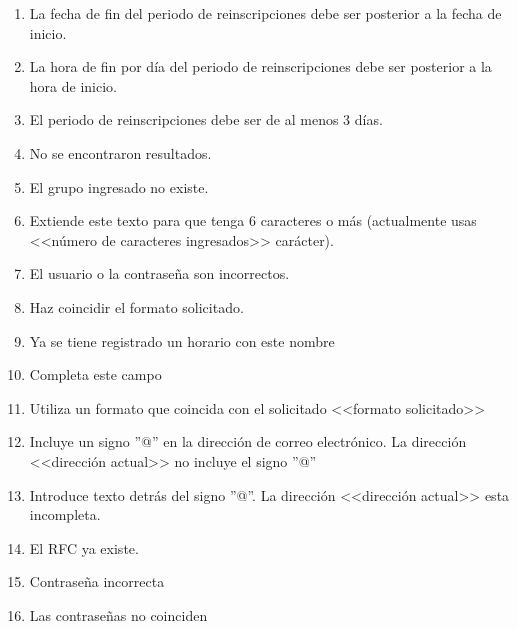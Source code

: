 \begin{enumerate}[{ME} 1.]
\item La fecha de fin del periodo de reinscripciones debe ser posterior a la fecha de inicio.
\item La hora de fin por día del periodo de reinscripciones debe ser posterior a la hora de inicio.
\item El periodo de reinscripciones debe ser de al menos 3 días.
\item No se encontraron resultados.
\item El grupo ingresado no existe.
\item Extiende este texto para que tenga 6 caracteres o más (actualmente usas <<número de caracteres ingresados>> carácter).
\item El usuario o la contraseña son incorrectos.
\item Haz coincidir el formato solicitado.
\item Ya se tiene registrado un horario con este nombre
\item Completa este campo
\item Utiliza un formato que coincida con el solicitado <<formato solicitado>>
\item Incluye un signo ''@''  en la dirección de correo electrónico. La dirección <<dirección actual>> no incluye el signo ''@''
\item Introduce texto detrás del signo ''@''. La dirección <<dirección actual>> esta incompleta.
\item El RFC ya existe.
\item Contraseña incorrecta
\item Las contraseñas no coinciden
\end{enumerate} 
